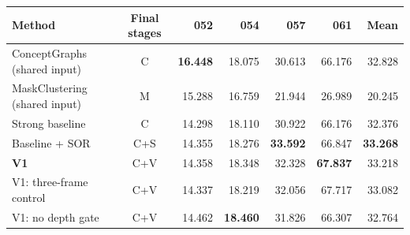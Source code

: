 \begin{tabular}{lcrrrrr}
\toprule
Method & Final stages & 052 & 054 & 057 & 061 & Mean \\
\midrule
ConceptGraphs (shared input) & C & \textbf{16.448} & 18.075 & 30.613 & 66.176 & 32.828 \\
MaskClustering (shared input) & M & 15.288 & 16.759 & 21.944 & 26.989 & 20.245 \\
Strong baseline & C & 14.298 & 18.110 & 30.922 & 66.176 & 32.376 \\
Baseline + SOR & C+S & 14.355 & 18.276 & \textbf{33.592} & 66.847 & \textbf{33.268} \\
\rowcolor{ourstint}\textbf{V1} & C+V & 14.358 & 18.348 & 32.328 & \textbf{67.837} & 33.218 \\
V1: three-frame control & C+V & 14.337 & 18.219 & 32.056 & 67.717 & 33.082 \\
V1: no depth gate & C+V & 14.462 & \textbf{18.460} & 31.826 & 66.307 & 32.764 \\
\bottomrule
\end{tabular}
